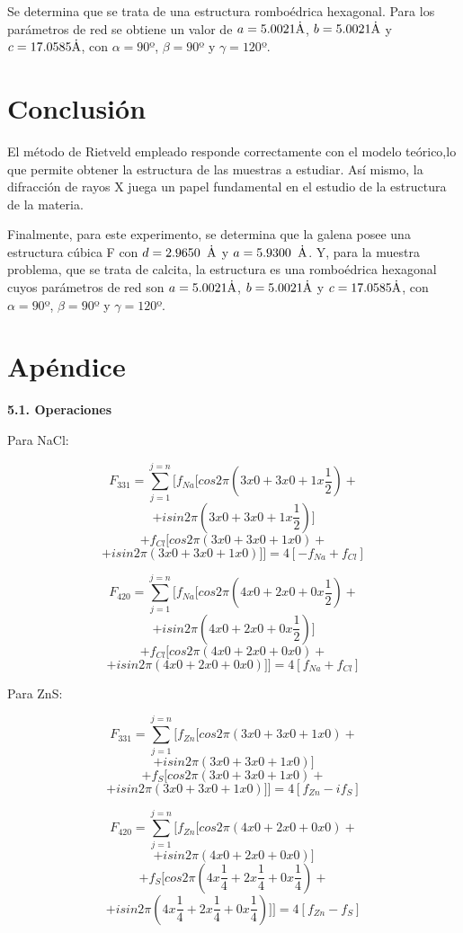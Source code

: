 \documentclass[a4paper,twocolumn,10pt]{article}
\begin{document}
Se determina que se trata de una estructura romboédrica hexagonal. Para los parámetros de red se obtiene un valor de $a = 5.0021 \rm \dot{A}$, $b = 5.0021 \rm \dot{A}$ y  $c = 17.0585 \rm \dot{A}$,  con $\alpha=90$º, $\beta = 90$º y $\gamma = 120$º.


\section{Conclusión}

El método de Rietveld empleado responde correctamente con el modelo teórico,lo que permite obtener la estructura de las muestras a estudiar. Así mismo, la difracción de rayos X juega un papel fundamental en el estudio de la estructura de la materia. 

Finalmente, para este experimento, se determina que la galena posee una estructura cúbica F con $d=2.9650 \textcolor{white}{a} \rm \dot{A}$ y $a=5.9300 \textcolor{white}{a} \rm \dot{A}$. Y, para la muestra problema, que se trata de calcita, la estructura es una romboédrica hexagonal cuyos parámetros de red son $a = 5.0021 \rm \dot{A}$, $b = 5.0021 \rm \dot{A}$ y  $c = 17.0585 \rm \dot{A}$, con $\alpha=90$º, $\beta = 90$º y $\gamma = 120$º.
 
\section{Apéndice}




\textbf{5.1. Operaciones}

Para NaCl:

$$
F_{331} = \sum_{j=1}^{j=n} [f_{Na}[cos2\pi(3x0 + 3x0 + 1x\frac{1}{2}) +
$$
$$
+ isin2\pi(3x0 + 3x0 + 1x\frac{1}{2})] 
$$
$$
+ f_{Cl}[cos2\pi(3x0 + 3x0 + 1x0) +
$$
$$
+ isin2\pi(3x0 + 3x0 + 1x0)]] = 4[-f_{Na} + f_{Cl}]
$$

$$
F_{420} = \sum_{j=1}^{j=n} [f_{Na}[cos2\pi(4x0 + 2x0 + 0x\frac{1}{2}) +
$$
$$
+ isin2\pi(4x0 + 2x0 + 0x\frac{1}{2})] 
$$
$$
+ f_{Cl}[cos2\pi(4x0 + 2x0 + 0x0) +
$$
$$
+ isin2\pi(4x0 + 2x0 + 0x0)]] = 4[f_{Na} + f_{Cl}]
$$

Para ZnS:

$$
F_{331} = \sum_{j=1}^{j=n} [f_{Zn}[cos2\pi(3x0 + 3x0 + 1x0) +
$$
$$
+ isin2\pi(3x0 + 3x0 + 1x0)] 
$$
$$
+ f_{S}[cos2\pi(3x0 + 3x0 + 1x0) +
$$
$$
+ isin2\pi(3x0 + 3x0 + 1x0)]] = 4[f_{Zn} - if_{S}]
$$

$$
F_{420} = \sum_{j=1}^{j=n} [f_{Zn}[cos2\pi(4x0 + 2x0 + 0x0) +
$$
$$
+ isin2\pi(4x0 + 2x0 + 0x0)] 
$$
$$
+ f_{S}[cos2\pi(4x\frac{1}{4} + 2x\frac{1}{4} + 0x\frac{1}{4}) +
$$
$$
+ isin2\pi(4x\frac{1}{4} + 2x\frac{1}{4} + 0x\frac{1}{4})]] = 4[f_{Zn} - f_{S}]
$$
\end{document}
